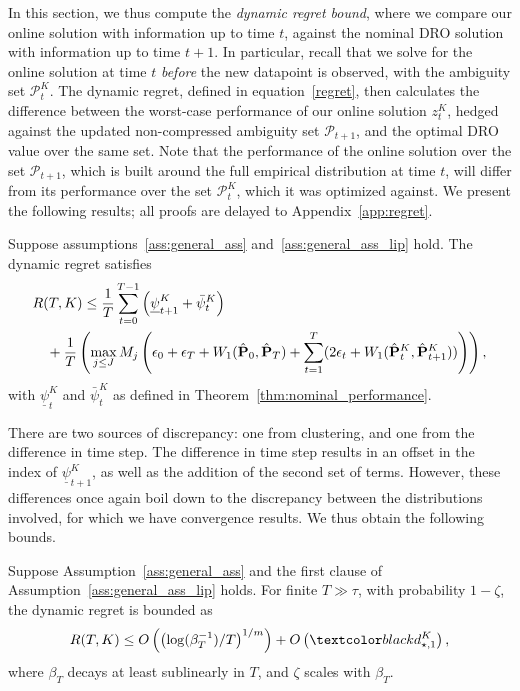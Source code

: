 In this section, we thus compute the {\it dynamic regret bound}, where we compare our online solution with information up to time $t$, against the nominal \gls{DRO} solution with information up to time $t+1$. 
In particular, recall that we solve for the online solution at time $t$ {\it before} the new datapoint is observed, with the ambiguity set $\mathcal{P}^K_{t}$. 
The dynamic regret, defined in equation~\eqref{regret},
then calculates the difference between the worst-case performance of our online solution $z^K_{t}$, hedged against the updated non-compressed ambiguity set $\mathcal{P}_{t+1}$, and the optimal \gls{DRO} value over the same set.
Note that the performance of the online solution over the set $\mathcal{P}_{t+1}$, which is built around the full empirical distribution at time $t$, will differ from its performance over the set $\mathcal{P}^K_{t}$, which it was optimized against.
We present the following results; all proofs are delayed to Appendix~\ref{app:regret}.
\begin{lemma}
\label{lem:regret}
    Suppose assumptions~\ref{ass:general_ass} and~\ref{ass:general_ass_lip} hold.
    The dynamic regret satisfies
    \begin{equation}
    \begin{aligned}
    &R(T,K) \leq  \frac{1}{T}\sum_{t=0}^{T-1} \left(\underline{\psi}_{t+1}^K + \bar{\psi}_t^K\right)\\
    &\quad + \frac{1}{T}\left(\max_{j\leq J}M_j\left(\epsilon_0 + \epsilon_{T}+W_1(\hat{{\mathbf P}}_0,\hat{{\mathbf P}}_{T})+\sum_{t=1}^T (2\epsilon_{t} +W_1(\hat{{\mathbf P}}^K_t,\hat{{\mathbf P}}^K_{t+1}))\right)\right),
    \end{aligned}
    \end{equation} 
    with $\underline{\psi}_{t}^K$ and $\bar{\psi}^K_t$ as defined in Theorem~\ref{thm:nominal_performance}.
    \end{lemma}
 There are two sources of discrepancy: one from clustering, and one from the difference in time step. The difference in time step results in an offset in the index of $\underline{\psi}_{t+1}^K$, as well as the addition of the second set of terms. 
However, these differences once again boil down to the discrepancy between the distributions involved, for which we have convergence results. 
We thus obtain the following bounds. 
\begin{theorem}
\label{thm:regret}
Suppose Assumption~\ref{ass:general_ass} and the first clause of Assumption~\ref{ass:general_ass_lip} holds. For finite $T \gg \tau$, with probability $1-\zeta$, the dynamic regret is bounded as 
   $$R(T,K) \leq O\left(\left(\log(\beta_T^{-1})/T\right)^{1/m}\right) + 
O\left(\RC{d^K_{\star,1}}\right),$$
   where $\beta_T$ decays at least sublinearly in $T$, and $\zeta$ scales with $\beta_T$.
\end{theorem}
